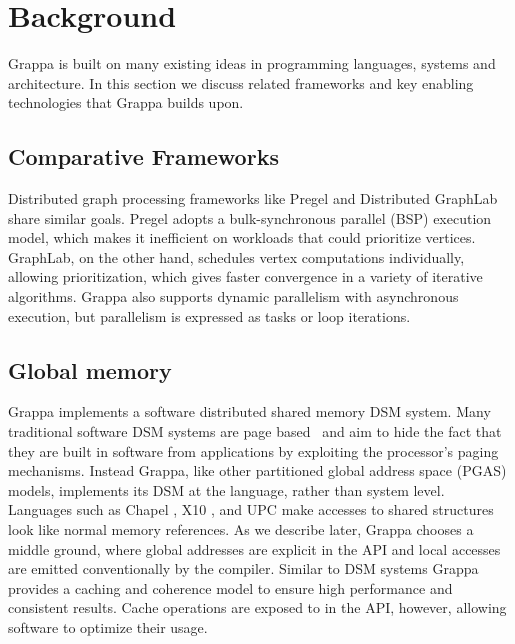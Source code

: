 \section{Background}

Grappa is built on many existing ideas in programming languages, systems and
architecture. In this section we discuss related frameworks and key enabling
technologies that Grappa builds upon.

\subsection{Comparative Frameworks}

Distributed graph processing frameworks like Pregel \cite{pregel:2010} and
Distributed GraphLab \cite{distgraphlab:vldb12} share similar goals. Pregel
adopts a bulk-synchronous parallel (BSP) execution model, which makes it
inefficient on workloads that could prioritize vertices. GraphLab, on the
other hand, schedules vertex computations individually, allowing
prioritization, which gives faster convergence in a variety of iterative
algorithms. Grappa also supports dynamic parallelism
with asynchronous execution, but parallelism is expressed as tasks or loop
iterations.

\subsection{Global memory}

Grappa implements a software distributed shared memory DSM system. Many
traditional software DSM systems are page based~\cite{Treadmarks,munin} and
aim to hide the fact that they are built in software from applications by
exploiting the processor's paging mechanisms. Instead Grappa, like other
partitioned global address space (PGAS) models, implements its DSM at the
language, rather than system level. Languages such as Chapel \cite{Chapel},
X10 \cite{X10}, and UPC \cite{UPC} make accesses to shared structures look
like normal memory references. As we describe later, Grappa chooses a middle
ground, where global addresses are explicit in the API and local accesses are
emitted conventionally by the compiler. Similar to DSM systems Grappa provides
a caching and coherence model to ensure high performance and consistent
results. Cache operations are exposed to in the API, however, allowing
software to optimize their usage.

